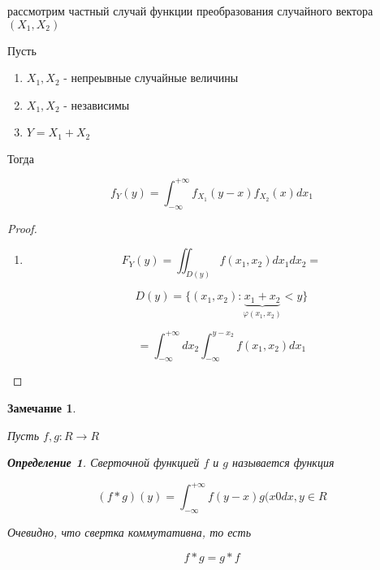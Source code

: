 \documentclass[a4paper, 14pt]{report}
\newtheorem{defenition}{Определение}[section]
\newtheorem{note}{Замечание}[section]
\begin{document}
рассмотрим частный случай функции преобразования случайного вектора $(X_1, X_2)$

\begin{theorem}
    Пусть

    \begin{enumerate}
        \item $X_1,X_2$ - непреывные случайные величины
        \item $X_1,X_2$ - независимы
        \item $Y=X_1+X_2$
    \end{enumerate}

    Тогда

    $$
    f_Y(y) = \int_{-\infty}^{+\infty} f_{X_1}(y-x) f_{X_2}(x)dx_1
    $$
\end{theorem}

\begin{proof}
    \begin{enumerate}
        \item

            $$
            F_Y(y) = \iint_{D(y)} f(x_1, x_2) dx_1dx_2 =
            $$

            $$
            D(y) = \{ (x_1,x_2) : \underbrace{x_1 + x_2}_{\varphi(x_1,x_2)} < y \}
            $$

            $$
            = \int_{-\infty}^{+\infty} dx_2 \int_{-\infty}^{y - x_2} f(x_1, x_2) dx_1
            $$
    \end{enumerate}
\end{proof}

\begin{note}
    \begin{enunmerate}
    \item Пусть $f,g : R \to R$
    \end{enunmerate}

    \begin{defenition}
        Сверточной функцией $f$ и $g$ называется функция

        $$
        (f*g)(y) = \int_{-\infty}^{+\infty} f(y-x) g(x0 dx, y \in R
        $$
    \end{defenition}

\item Очевидно, что свертка коммутативна, то есть

    $$
    f*g = g*f
    $$
\end{note}
\end{document}

